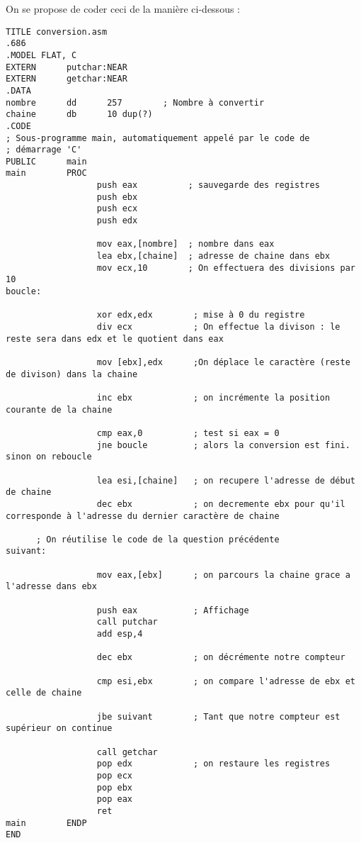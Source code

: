 \noindent On se propose de coder ceci de la manière ci-dessous :
\begin{lstlisting}[language={[x86masm]Assembler}]
TITLE conversion.asm
.686
.MODEL FLAT, C
EXTERN      putchar:NEAR
EXTERN      getchar:NEAR
.DATA
nombre      dd      257        ; Nombre à convertir
chaine      db      10 dup(?)
.CODE
; Sous-programme main, automatiquement appelé par le code de
; démarrage 'C'
PUBLIC      main
main        PROC
                  push eax          ; sauvegarde des registres
                  push ebx
                  push ecx
                  push edx
                  
                  mov eax,[nombre]  ; nombre dans eax
                  lea ebx,[chaine]  ; adresse de chaine dans ebx
                  mov ecx,10        ; On effectuera des divisions par 10
boucle:

                  xor edx,edx        ; mise à 0 du registre
                  div ecx            ; On effectue la divison : le reste sera dans edx et le quotient dans eax

                  mov [ebx],edx      ;On déplace le caractère (reste de divison) dans la chaine
                  
                  inc ebx            ; on incrémente la position courante de la chaine
                  
                  cmp eax,0          ; test si eax = 0
                  jne boucle         ; alors la conversion est fini. sinon on reboucle

                  lea esi,[chaine]   ; on recupere l'adresse de début de chaine
                  dec ebx            ; on decremente ebx pour qu'il corresponde à l'adresse du dernier caractère de chaine  

      ; On réutilise le code de la question précédente
suivant:

                  mov eax,[ebx]      ; on parcours la chaine grace a l'adresse dans ebx

                  push eax           ; Affichage             
                  call putchar                  
                  add esp,4

                  dec ebx            ; on décrémente notre compteur

                  cmp esi,ebx        ; on compare l'adresse de ebx et celle de chaine

                  jbe suivant        ; Tant que notre compteur est supérieur on continue
                  
                  call getchar                  
                  pop edx            ; on restaure les registres
                  pop ecx
                  pop ebx
                  pop eax     
                  ret                  
main        ENDP
END
\end{lstlisting}

